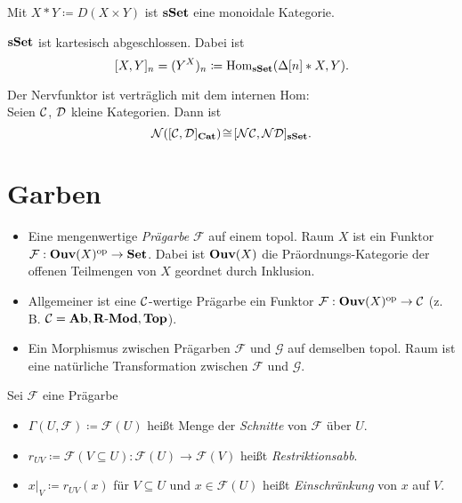 \documentclass{cheat-sheet}
\newcommand{\Fais}{\mathcal{F}} %
\newcommand{\Garb}{\mathcal{G}} %
\newcommand{\Nerve}{\mathcal{N}} %
\begin{document}
\begin{bem}
  Mit $X \!*\! Y \coloneqq D(X \!\times\! Y)$ ist $\mathbf{sSet}$ eine monoidale Kategorie.
\end{bem}

\begin{prop}
  $\mathbf{sSet}$ ist kartesisch abgeschlossen. Dabei ist
  \[ [X, Y]_n = (Y^X)_n \coloneqq \operatorname{Hom}_{\mathbf{sSet}}(\Delta[n] * X, Y). \]
\end{prop}

\begin{prop}
  Der Nervfunktor ist verträglich mit dem internen Hom: \\
  Seien $\mathcal{C}$, $\mathcal{D}$ kleine Kategorien. Dann ist
  \[ \Nerve([\Cat, \Dat]_{\CatC}) \!\cong\! [\Nerve\Cat, \Nerve\Dat]_{\sSet}. \]
\end{prop}

\section{Garben}



\begin{defn}
  \begin{itemize}
    \item Eine mengenwertige \emph{Prägarbe} $\Fais$ auf einem topol. Raum $X$ ist ein Funktor
    $\Fais : \Ouv(X)^\op \to \SetC$.
    Dabei ist $\mathbf{Ouv}(X)$ die Präordnungs-Kategorie der offenen Teilmengen von $X$ geordnet durch Inklusion.
    \item Allgemeiner ist eine $\mathcal{C}$-wertige Prägarbe ein Funktor $\Fais : \Ouv(X)^\op \to \Cat$ (z.\,B. $\mathcal{C} = \mathbf{Ab}, \mathbf{R\text{-}Mod}, \mathbf{Top}$).
    \item Ein Morphismus zwischen Prägarben $\Fais$ und $\Garb$ auf demselben topol. Raum ist eine natürliche Transformation zwischen $\Fais$ und $\Garb$.
  \end{itemize}
\end{defn}

\begin{nota}
  Sei $\Fais$ eine Prägarbe
  \begin{itemize}
    \item $\Gamma(U, \Fais) \coloneqq \Fais(U)$ heißt Menge der \emph{Schnitte} von $\Fais$ über $U$.
    \item $r_{UV} \coloneqq \Fais(V \subseteq U) : \Fais(U) \to \Fais(V)$ heißt \emph{Restriktionsabb}.
    \item $x|_V \coloneqq r_{UV}(x)$ für $V \subseteq U$ und $x \in \Fais(U)$ heißt \emph{Einschränkung} von $x$ auf $V$.
  \end{itemize}
\end{nota}
\end{document}
